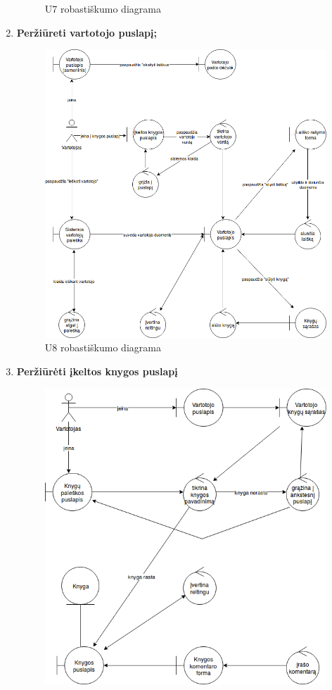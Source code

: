 \documentclass{VUMIFPSkursinis}
\begin{document}
\begin{enumerate}[label=\textbf{U\arabic*.}]
\begin{figure}[H]
					\caption{U7 robastiškumo diagrama}
					\label{img:psi2-u7-robustness}
				\end{figure}
			\item \textbf{Peržiūreti vartotojo puslapį;}
				\begin{figure}[H]
					\centering
					\includegraphics[scale=0.6]{img/U8.png}
					\caption{U8 robastiškumo diagrama}
					\label{img:psi2-u8-robustness}
				\end{figure}
			\item \textbf{Peržiūrėti įkeltos knygos puslapį}
				\begin{figure}[H]
					\centering
					\includegraphics[scale=0.6]{img/U9.png}

\end{figure}
\end{enumerate}
\end{document}

